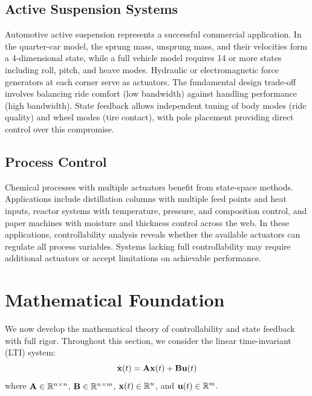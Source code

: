 \subsection{Active Suspension Systems}

Automotive active suspension represents a successful commercial application. In the quarter-car model, the sprung mass, unsprung mass, and their velocities form a 4-dimensional state, while a full vehicle model requires 14 or more states including roll, pitch, and heave modes. Hydraulic or electromagnetic force generators at each corner serve as actuators. The fundamental design trade-off involves balancing ride comfort (low bandwidth) against handling performance (high bandwidth). State feedback allows independent tuning of body modes (ride quality) and wheel modes (tire contact), with pole placement providing direct control over this compromise.

\subsection{Process Control}

Chemical processes with multiple actuators benefit from state-space methods. Applications include distillation columns with multiple feed points and heat inputs, reactor systems with temperature, pressure, and composition control, and paper machines with moisture and thickness control across the web. In these applications, controllability analysis reveals whether the available actuators can regulate all process variables. Systems lacking full controllability may require additional actuators or accept limitations on achievable performance.

\section{Mathematical Foundation}

We now develop the mathematical theory of controllability and state feedback with full rigor. Throughout this section, we consider the linear time-invariant (LTI) system:
\begin{equation}
\dot{\mathbf{x}}(t) = \mathbf{A}\mathbf{x}(t) + \mathbf{B}\mathbf{u}(t)
\label{eq:lti_system}
\end{equation}
where $\mathbf{A} \in \mathbb{R}^{n \times n}$, $\mathbf{B} \in \mathbb{R}^{n \times m}$, $\mathbf{x}(t) \in \mathbb{R}^n$, and $\mathbf{u}(t) \in \mathbb{R}^m$.

